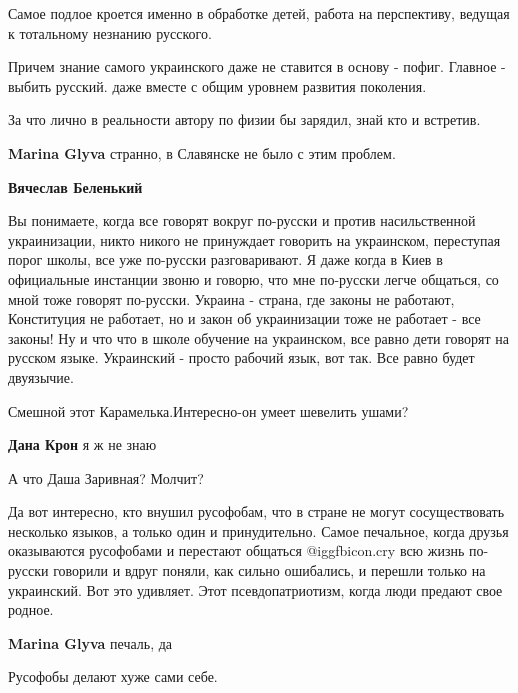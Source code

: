 \begin{itemize}
\begin{itemize}
Самое подлое кроется именно в обработке детей, работа на перспективу, ведущая к
тотальному незнанию русского.

Причем знание самого украинского даже не ставится в основу - пофиг. Главное -
выбить русский. даже вместе с общим уровнем развития поколения.

За что лично в реальности автору по физии бы зарядил, знай кто и встретив.


\textbf{Marina Glyva} странно, в Славянске не было с этим проблем.

\textbf{Вячеслав Беленький} 

Вы понимаете, когда все говорят вокруг по-русски и против насильственной
украинизации, никто никого не принуждает говорить на украинском, переступая
порог школы, все уже по-русски разговаривают. Я даже когда в Киев в официальные
инстанции звоню и говорю, что мне по-русски легче общаться, со мной тоже
говорят по-русски. Украина - страна, где законы не работают, Конституция не
работает, но и закон об украинизации тоже не работает - все законы! Ну и что
что в школе обучение на украинском, все равно дети говорят на русском языке.
Украинский - просто рабочий язык, вот так. Все равно будет двуязычие.

\end{itemize} %

Смешной этот Карамелька.Интересно-он умеет шевелить ушами?

\begin{itemize} %
\textbf{Дана Крон} я ж не знаю
\end{itemize} %

А что Даша Заривная? Молчит?


Да вот интересно, кто внушил русофобам, что в стране не могут сосуществовать
несколько языков, а только один и принудительно. Самое печальное, когда друзья
оказываются русофобами и перестают общаться @igg{fbicon.cry} всю жизнь по-русски говорили и
вдруг поняли, как сильно ошибались, и перешли только на украинский. Вот это
удивляет. Этот псевдопатриотизм, когда люди предают свое родное.

\begin{itemize} %
\textbf{Marina Glyva} печаль, да

Русофобы делают хуже сами себе.
\end{itemize} %


\end{itemize}
